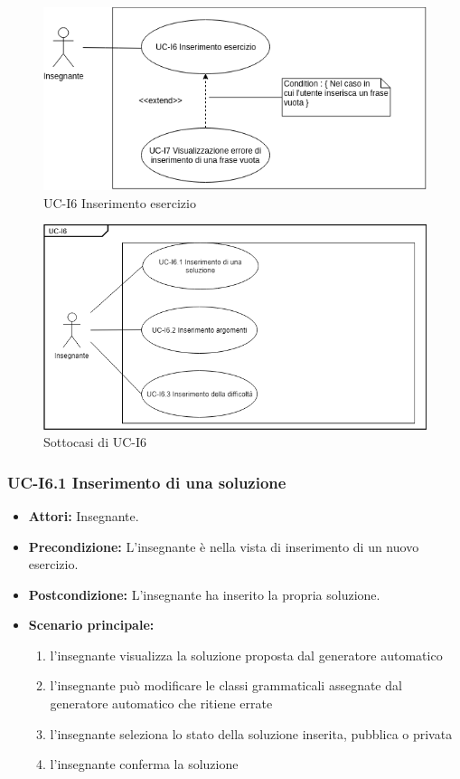 	\begin{figure}[h]
		\centering
		\includegraphics[scale=0.7]{images/UC-I6ext.png}
		\caption{UC-I6 Inserimento esercizio}
	\end{figure}
	\begin{figure}[h]
		\centering
		\includegraphics[scale=0.7]{images/UC-I6.png}
		\caption{Sottocasi di UC-I6}
	\end{figure}

\subsubsection{UC-I6.1 Inserimento di una soluzione}
\begin{itemize}
\item \textbf{Attori: }Insegnante.
\item \textbf{Precondizione: }L'insegnante è nella vista di inserimento di un nuovo esercizio.
\item \textbf{Postcondizione: }L'insegnante ha inserito la propria soluzione.
\item \textbf{Scenario principale: }
		\begin{enumerate} 
		\item l'insegnante visualizza la soluzione proposta dal generatore automatico
		\item l'insegnante può modificare le classi grammaticali assegnate dal generatore automatico che ritiene errate
		\item l'insegnante seleziona lo stato della soluzione inserita, pubblica o privata
		\item l'insegnante conferma la soluzione
		\end{enumerate}	
\end{itemize}

